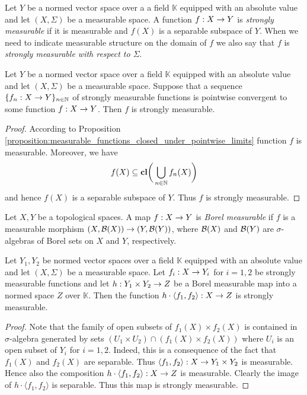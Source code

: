 \begin{definition}
Let $Y$ be a normed vector space over a a field $\mathbb{K}$ equipped with an absolute value and let $(X,\Sigma)$ be a measurable space. A function $f:X\rightarrow Y$ is \textit{strongly measurable} if it is measurable and $f(X)$ is a separable subspace of $Y$. When we need to indicate measurable structure on the domain of $f$ we also say that $f$ is \textit{strongly measurable with respect to $\Sigma$}.
\end{definition}

\begin{proposition}\label{proposition:strongly_measurable_functions_closed_under_pointwise_limits}
Let $Y$ be a normed vector space over a field $\mathbb{K}$ equipped with an absolute value and let $(X,\Sigma)$ be a measurable space. Suppose that a sequence $\{f_n:X\rightarrow Y\}_{n\in {\mathbb N}}$ of strongly measurable functions is pointwise convergent to some function $f:X\rightarrow Y$. Then $f$ is strongly measurable.
\end{proposition}
\begin{proof}
According to Proposition \ref{proposition:measurable_functions_closed_under_pointwise_limits} function $f$ is measurable. Moreover, we have
$$f(X) \subseteq \mathbf{cl}\bigg(\bigcup_{n\in {\mathbb N}}f_n(X)\bigg)$$
and hence $f(X)$ is a separable subspace of $Y$. Thus $f$ is strongly measurable.
\end{proof}

\begin{definition}
Let $X, Y$ be a topological spaces. A map $f:X\rightarrow Y$ is \textit{Borel measurable} if $f$ is a measurable morphism $(X,{\mathcal B}(X))\rightarrow (Y,{\mathcal B}(Y))$, where ${\mathcal B}(X)$ and ${\mathcal B}(Y)$ are $\sigma$-algebras of Borel sets on $X$ and $Y$, respectively.
\end{definition}

\begin{proposition}\label{proposition:strongly_measurable_closed_under_Borel_operations}
Let $Y_1, Y_2$ be normed vector spaces over a field $\mathbb{K}$ equipped with an absolute value and let $(X,\Sigma)$ be a measurable space. Let $f_i:X\rightarrow Y_i$ for $i=1,2$ be strongly measurable functions and let $h:Y_1\times Y_2\rightarrow Z$ be a Borel measurable map into a normed space $Z$ over $\mathbb{K}$. Then the function $h\cdot \langle f_1,f_2\rangle:X\rightarrow Z$ is strongly measurable.
\end{proposition}
\begin{proof}
Note that the family of open subsets of $f_1(X)\times f_2(X)$ is contained in $\sigma$-algebra generated by sets $\left(U_1\times U_2\right)\cap \left(f_1(X)\times f_2(X)\right)$ where $U_i$ is an open subset of $Y_i$ for $i=1,2$. Indeed, this is a consequence of the fact that $f_1(X)$ and $f_2(X)$ are separable. Thus $\langle f_1, f_2\rangle:X\rightarrow Y_1\times Y_2$ is measurable. Hence also the composition $h\cdot \langle f_1,f_2\rangle:X\rightarrow Z$ is measurable. Clearly the image of $h\cdot \langle f_1,f_2\rangle$ is separable. Thus this map is strongly measurable.
\end{proof}

